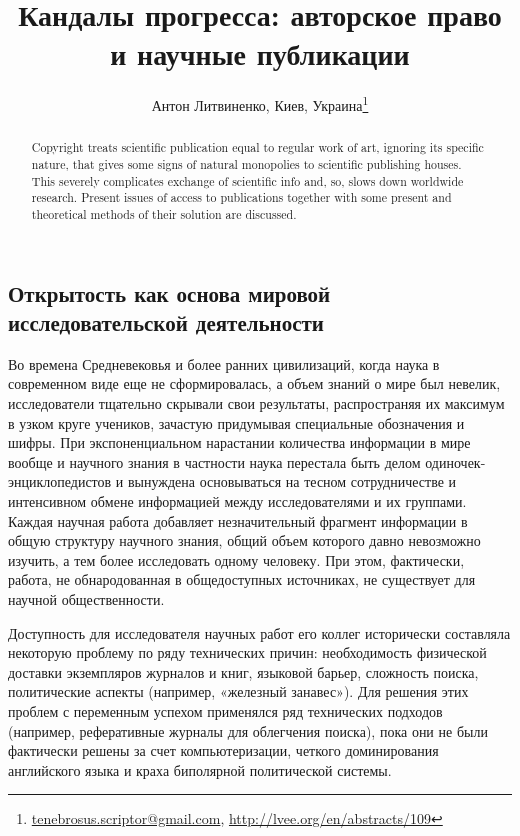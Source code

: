 \documentclass[10pt, a5paper]{article}
\begin{document}
\title{Кандалы прогресса: авторское право и научные публикации}
\author{Антон Литвиненко, Киев, Украина\footnote{\url{tenebrosus.scriptor@gmail.com}, \url{http://lvee.org/en/abstracts/109}}}
\maketitle
\begin{abstract}
Copyright treats scientific publication equal to regular work of art, ignoring its specific nature, that gives some signs of natural monopolies to scientific publishing houses. This severely complicates exchange of scientific info and, so, slows down worldwide research. Present issues of access to publications together with some present and theoretical methods of their solution are discussed.
\end{abstract}
\subsection*{Открытость как основа мировой исследовательской деятельности}

Во времена Средневековья и более ранних цивилизаций, когда наука в современном виде еще не сформировалась, а объем знаний о мире был невелик, исследователи тщательно скрывали свои результаты, распространяя их максимум в узком круге учеников, зачастую придумывая специальные обозначения и шифры. При экспоненциальном нарастании количества информации в мире вообще и научного знания в частности наука перестала быть делом одиночек-энциклопедистов и вынуждена основываться на тесном сотрудничестве и интенсивном обмене информацией между исследователями и их группами. Каждая научная работа добавляет незначительный фрагмент информации в общую структуру научного знания, общий объем которого давно невозможно изучить, а тем более исследовать одному человеку. При этом, фактически, работа, не обнародованная в общедоступных источниках, не существует для научной общественности.

Доступность для исследователя научных работ его коллег исторически составляла некоторую проблему по ряду технических причин: необходимость физической доставки экземпляров журналов и книг, языковой барьер, сложность поиска, политические аспекты (например, «железный занавес»). Для решения этих проблем с переменным успехом применялся ряд технических подходов (например, реферативные журналы для облегчения поиска), пока они не были фактически решены за счет компьютеризации, четкого доминирования английского языка и краха биполярной политической системы.
\end{document}
